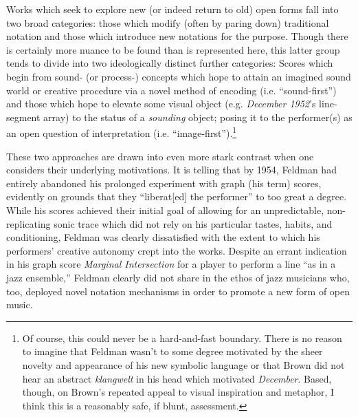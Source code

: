     Works which seek to explore new (or indeed return to old) open forms fall into two broad categories: those which modify (often by paring down) traditional notation and those which introduce new notations for the purpose. Though there is certainly more nuance to be found than is represented here, this latter group tends to divide into two ideologically distinct further categories: Scores which begin from sound- (or process-) concepts which hope to attain an imagined sound world or creative procedure via a novel method of encoding (i.e. ``sound-first'') and those which hope to elevate some visual object (e.g. \textit{December 1952}'s line-segment array) to the status of a \textit{sounding} object; posing it to the performer(s) as an open question of interpretation (i.e. ``image-first'').\footnote{Of course, this could never be a hard-and-fast boundary. There is no reason to imagine that Feldman wasn't to some degree motivated by the sheer novelty and appearance of his new symbolic language or that Brown did not hear an abstract \textit{klangwelt} in his head which motivated \textit{December}. Based, though, on Brown's repeated appeal to visual inspiration and metaphor, I think this is a reasonably safe, if blunt, assessment.} 

    These two approaches are drawn into even more stark contrast when one considers their underlying motivations. It is telling that by 1954, Feldman had entirely abandoned his prolonged experiment with graph (his term) scores, evidently on grounds that they ``liberat[ed] the performer'' to too great a degree. While his scores achieved their initial goal of allowing for an unpredictable, non-replicating sonic trace which did not rely on his particular tastes, habits, and conditioning, Feldman was clearly dissatisfied with the extent to which his performers' creative autonomy crept into the works.\autocite[99]{Taruskin_2009d} Despite an errant indication in his graph score \textit{Marginal Intersection} for a player to perform a line ``as in a jazz ensemble,'' Feldman clearly did not share in the ethos of jazz musicians who, too, deployed novel notation mechanisms in order to promote a new form of open music.\autocite{Dohoney_2017}


